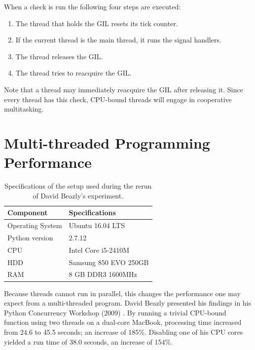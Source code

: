 

When a check is run the following four steps are executed:
\begin{enumerate}
	\item The thread that holds the GIL resets its tick counter.
	\item If the current thread is the main thread, it runs the signal handlers.
	\item The thread releases the GIL.
	\item The thread tries to reacquire the GIL.
\end{enumerate}

Note that a thread may immediately reacquire the GIL after releasing it.
Since every thread has this check, CPU-bound threads will engage in cooperative multitasking.

\section{Multi-threaded Programming Performance}
\label{sct:multi_theaded_programming_performance}

\begin{table}[h]
	\centering
	\caption{Specifications of the setup used during the rerun of David Beazly's experiment.}
	\label{table:rerun_beazily}
	\begin{tabular}{l|l}
		\textbf{Component} 	& \textbf{Specifications} \\ \hline
		Operating System   	& Ubuntu 16.04 LTS \\
		Python version		& 2.7.12 \\
		CPU					& Intel Core i5-2410M \\ 
		HDD					& Samsung 850 EVO 250GB  \\ 
		RAM					& 8 GB DDR3 1600MHz \\
	\end{tabular}
\end{table}

Because threads cannot run in parallel, this changes the performance one may expect from a multi-threaded program.
David Beazly presented his findings in his Python Concurrency Workshop (2009) \cite{beazley2009inside}.
By running a trivial CPU-bound function using two threads on a dual-core MacBook, processing time increased from 24.6 to 45.5 seconds; an increase of 185\%.
Disabling one of his CPU cores yielded a run time of 38.0 seconds, an increase of 154\%.

